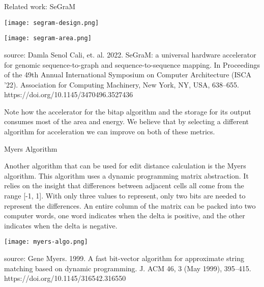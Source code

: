 \documentclass{cbxposter}
\renewcommand{\smallskip}{\vspace{0.16667in}}
\begin{document}
\begin{frame}[fragile,t]{}
\begin{columns}[T]
\begin{column}{10.5in}
\begin{block}{Related work: SeGraM}
  \begin{minipage}[t]{0.45\tw}
    \vspace{0pt}\centering
    \smallskip
    \texttt{[image: segram-design.png]}
    \smallskip
  \end{minipage}
  \begin{minipage}[t]{0.45\tw}
    \vspace{0pt}\centering
    \smallskip
    \texttt{[image: segram-area.png]}
    \smallskip
  \end{minipage}

  source: Damla Senol Cali, et. al. 2022. SeGraM: a universal hardware
  accelerator for genomic sequence-to-graph and sequence-to-sequence 
  mapping. In Proceedings of the 49th Annual International Symposium on
  Computer Architecture (ISCA '22). Association for Computing Machinery,
  New York, NY, USA, 638–655. https://doi.org/10.1145/3470496.3527436

  \smallskip

  Note how the accelerator for the bitap algorithm and the storage for its
  output consumes most of the area and energy. We believe that by selecting
  a different algorithm for acceleration we can improve on both of these
  metrics.

\end{block}

\vspace{0.67in}
\begin{block}{Myers Algorithm}
  \smallskip

  Another algorithm that can be used for edit distance calculation is the
  Myers algorithm. This algorithm uses a dynamic programming matrix abstraction.
  It relies on the insight that differences between adjacent cells all come from
  the range [-1, 1]. With only three values to represent, only two bits are needed
  to represent the differences. An entire column of the matrix can be packed into
  two computer words, one word indicates when the delta is positive, and the other
  indicates when the delta is negative.

  \begin{center}
    \texttt{[image: myers-algo.png]}
  \end{center}

  source: Gene Myers. 1999. A fast bit-vector algorithm for approximate string
  matching based on dynamic programming. J. ACM 46, 3 (May 1999),
  395–415. https://doi.org/10.1145/316542.316550

\end{block}


\end{column}
\end{columns}
\end{frame}
\end{document}

